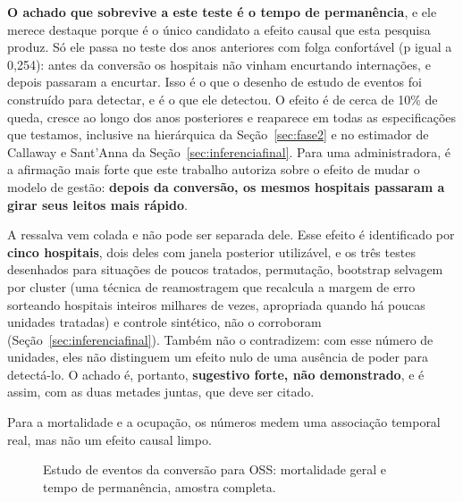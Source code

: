\textbf{O achado que sobrevive a este teste é o tempo de permanência},
e ele merece destaque porque é o único candidato a efeito causal que
esta pesquisa produz. Só ele passa no teste dos anos anteriores com
folga confortável (p igual a 0,254): antes da conversão os hospitais
não vinham encurtando internações, e depois passaram a encurtar. Isso é
o que o desenho de estudo de eventos foi construído para detectar, e é
o que ele detectou. O efeito é de cerca de 10\% de queda, cresce ao
longo dos anos posteriores e reaparece em todas as especificações que
testamos, inclusive na hierárquica da Seção~\ref{sec:fase2} e no
estimador de Callaway e Sant'Anna da
Seção~\ref{sec:inferenciafinal}. Para uma administradora, é a
afirmação mais forte que este trabalho autoriza sobre o efeito de
mudar o modelo de gestão: \textbf{depois da conversão, os mesmos
hospitais passaram a girar seus leitos mais rápido}.

A ressalva vem colada e não pode ser separada dele. Esse efeito é
identificado por \textbf{cinco hospitais}, dois deles com janela
posterior utilizável, e os três testes desenhados para situações de
poucos tratados, permutação, bootstrap selvagem por cluster (uma
técnica de reamostragem que recalcula a margem de erro sorteando
hospitais inteiros milhares de vezes, apropriada quando há poucas
unidades tratadas) e controle sintético,
não o corroboram (Seção~\ref{sec:inferenciafinal}). Também não o
contradizem: com esse número de unidades, eles não distinguem um efeito
nulo de uma ausência de poder para detectá-lo. O achado é, portanto,
\textbf{sugestivo forte, não demonstrado}, e é assim, com as duas
metades juntas, que deve ser citado.

Para a mortalidade e a ocupação, os números medem uma associação
temporal real, mas não um efeito causal limpo.

\newpage
{}

\begin{figure}[H]
\centering
{}
\caption{Estudo de eventos da conversão para OSS: mortalidade geral e
tempo de permanência, amostra completa.}
\label{fig:eventomorttmp}
\end{figure}

